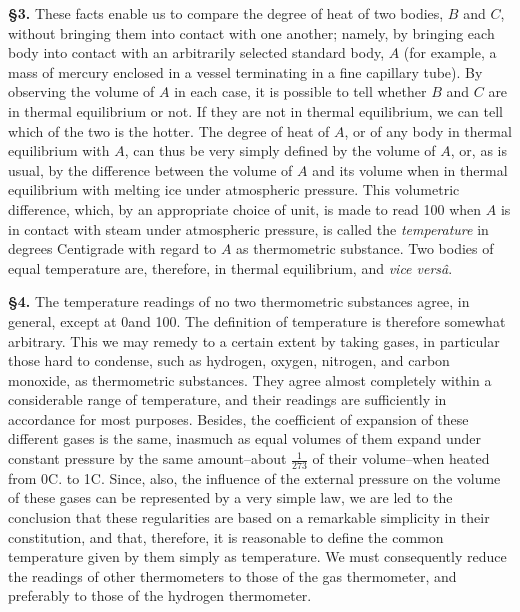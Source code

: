 \documentclass[oneside,12pt]{book}
\begin{document}
\textbf{\S 3.} These facts enable us to compare the degree of heat of two bodies, $B$ and $C$, without bringing them into contact with one another; namely, by bringing each body into contact with an arbitrarily selected standard body, $A$ (for example, a mass of mercury enclosed in a vessel terminating in a fine capillary tube). By observing the volume of $A$ in each case, it is possible to tell whether $B$ and $C$ are in thermal equilibrium or not. If they are not in thermal equilibrium, we can tell which of the two is the hotter. The degree of heat of $A$, or of any body in thermal equilibrium with $A$, can thus be very simply defined by the volume of $A$, or, as is usual, by the difference between the volume of $A$ and its volume when in thermal equilibrium with melting ice under atmospheric pressure. This volumetric difference, which, by an appropriate choice of unit, is made to read 100 when $A$ is in contact with steam under atmospheric pressure, is called the \textit{temperature} in degrees Centigrade with regard to $A$ as thermometric substance. Two bodies of equal temperature are, therefore, in thermal equilibrium, and \textit{vice vers\^a}. \par

\textbf{\S 4.} The temperature readings of no two thermometric substances agree, in general, except at 0\textdegree and 100\textdegree. The definition of temperature is therefore somewhat arbitrary. This we may remedy to a certain extent by taking gases, in particular those hard to condense, such as hydrogen, oxygen, nitrogen, and carbon monoxide, as thermometric substances. They agree almost completely within a considerable range of temperature, and their readings are sufficiently in accordance for most purposes. Besides, the coefficient of expansion of these different gases is the same, inasmuch as equal volumes of them expand under constant pressure by the same amount--about $\frac{1}{273}$ of their volume--when heated from 0\textdegree C. to 1\textdegree C. Since, also, the influence of the external pressure on the volume of these gases can be represented by a very simple law, we are led to the conclusion that these regularities are based on a remarkable simplicity in their constitution, and that, therefore, it is reasonable to define the common temperature given by them simply as temperature. We must consequently reduce the readings of other thermometers to those of the gas thermometer, and preferably to those of the hydrogen thermometer. \par
\end{document}
